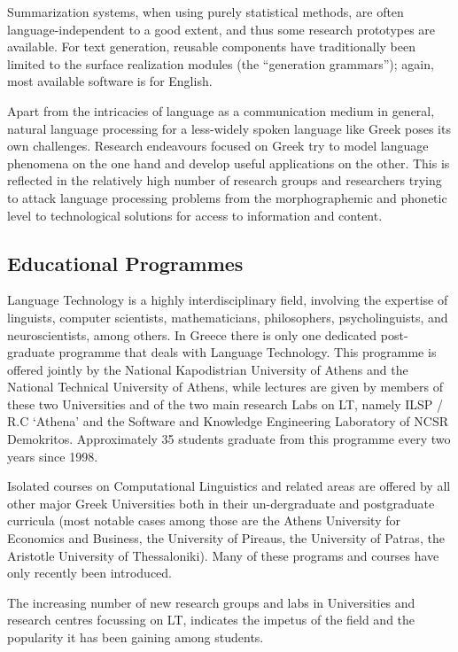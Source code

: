 \documentclass[]{../../metanetpaper}
\begin{document}
\begin{multicols}{2}
Summarization systems, when using purely statistical methods, are often language-independent to a good extent, and thus some research prototypes are available. For text generation, reusable components have traditionally been limited to the surface realization modules (the “generation grammars”); again, most available software is for English.

Apart from the intricacies of language as a communication medium in general, natural language processing for a less-widely spoken language like Greek poses its own challenges. Research endeavours focused on Greek try to model language phenomena on the one hand and develop useful applications on the other. This is reflected in the relatively high number of research groups and researchers trying to attack language processing problems from the morphographemic and phonetic level to technological solutions for access to information and content.

\subsection{Educational Programmes}

Language Technology is a highly interdisciplinary field, involving the expertise of linguists, computer scientists, mathematicians, philosophers, psycholinguists, and neuroscientists, among others. In Greece there is only one dedicated post-graduate programme that deals with Language Technology. This programme is offered jointly by the National Kapodistrian University of Athens and the National Technical University of Athens, while lectures are given by members of these two Universities and of the two main research Labs on LT, namely ILSP / R.C ‘Athena’ and the Software and Knowledge Engineering Laboratory of NCSR Demokritos. Approximately 35 students graduate from this programme every two years since 1998.

Isolated courses on Computational Linguistics and related areas are offered by all other major Greek Universities both in their un-dergraduate and postgraduate curricula (most notable cases among those are the Athens University for Economics and Business, the University of Pireaus, the University of Patras, the Aristotle University of Thessaloniki). Many of these programs and courses have only recently been introduced.

The increasing number of new research groups and labs in Universities and research centres focussing on LT, indicates the impetus of the field and the popularity it has been gaining among students.


\end{multicols}
\end{document}
